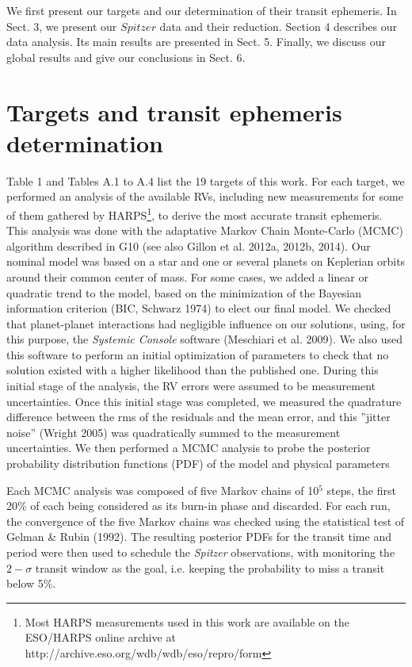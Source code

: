 \documentclass[traditabstract]{aa}
\begin{document}
 We first present our targets and our determination of their transit  ephemeris. 
 In Sect. 3, we present our $Spitzer$ data and their reduction.  Section 4 describes our data analysis. Its
 main results are presented in Sect. 5. Finally,  we discuss our global results and give our conclusions in Sect. 6. 

\section{Targets and transit ephemeris determination}

Table 1 and Tables A.1 to A.4 list the 19 targets of this work. For each target, we performed an analysis of the available 
RVs, including new measurements for some of them gathered by HARPS\footnote{Most HARPS measurements used in this work 
are available on the ESO/HARPS online archive at http://archive.eso.org/wdb/wdb/eso/repro/form}, to derive 
the most accurate transit ephemeris. This analysis was done with the adaptative Markov Chain Monte-Carlo 
(MCMC) algorithm described in G10 (see also Gillon et al. 2012a, 2012b, 2014).  Our nominal model was based 
on a star and one or several planets on Keplerian orbits around their common center of mass. For some cases, 
we added a linear or quadratic trend to the model, based on the minimization of the Bayesian information criterion 
(BIC, Schwarz 1974) to elect our  final model. We checked that planet-planet interactions had negligible influence 
on our solutions, using, for this  purpose, the {\it Systemic Console} software (Meschiari et al. 2009). We also 
used this software to perform an  initial optimization of parameters  to check that no solution existed with a higher 
likelihood than the published one. During this initial stage
 of the analysis, the RV errors   were assumed to be measurement uncertainties.  Once this initial stage 
 was completed, we measured the  quadrature difference between the rms of the residuals and the mean error, 
 and this ''jitter noise'' (Wright  2005) was quadratically summed to the measurement uncertainties. We  then 
 performed a MCMC analysis to  probe the posterior  probability distribution functions (PDF) of the model and 
 physical parameters

Each MCMC analysis was composed of five Markov chains of 10$^5$ steps, the first 20\% of each being 
considered as its burn-in phase and discarded. For each run, the convergence of the five Markov chains was 
checked using the statistical test of Gelman \& Rubin (1992). The resulting posterior PDFs for the transit time 
and period were then used to schedule the {\it Spitzer} observations, with monitoring the $2-\sigma$ transit 
window as the goal, i.e. keeping the probability to miss a transit below 5\%. 
\end{document}
